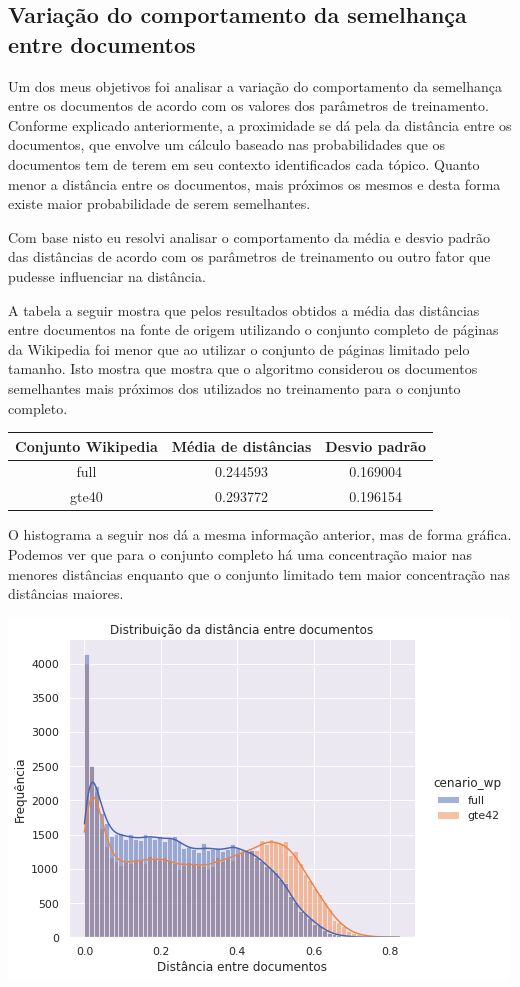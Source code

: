 \subsection{Variação do comportamento da semelhança entre documentos}

Um dos meus objetivos foi analisar a variação do comportamento da semelhança entre os documentos de acordo com os valores dos parâmetros de 
treinamento. Conforme explicado anteriormente, a proximidade se dá pela da distância entre os documentos, que envolve um cálculo baseado
nas probabilidades que os documentos tem de terem em seu contexto identificados cada tópico. Quanto menor a distância entre os documentos, mais
próximos os mesmos e desta forma existe maior probabilidade de serem semelhantes.

Com base nisto eu resolvi analisar o comportamento da média e desvio padrão das distâncias de acordo com os parâmetros de treinamento ou outro fator
que pudesse influenciar na distância.

A tabela a seguir mostra que pelos resultados obtidos a média das distâncias entre documentos na fonte de origem utilizando o conjunto completo 
de páginas da Wikipedia foi menor que ao utilizar o conjunto de páginas limitado pelo tamanho. Isto mostra que mostra que o algoritmo considerou 
os documentos semelhantes mais próximos dos utilizados no treinamento para o conjunto completo.

\begin{center}
    \begin{tabular}{|c|c|c|}
        \hline
        Conjunto Wikipedia & Média de distâncias & Desvio padrão \\
        \hline
        full & 0.244593 & 0.169004 \\
        \hline
        gte40 & 0.293772 & 0.196154 \\
        \hline
    \end{tabular}
\end{center}

O histograma a seguir nos dá a mesma informação anterior, mas de forma gráfica. Podemos ver que para o conjunto completo há uma concentração
maior nas menores distâncias enquanto que o conjunto limitado tem maior concentração nas distâncias maiores.

\includegraphics[scale=0.7]{resultados/resources/distribuicao_distancias.png}

